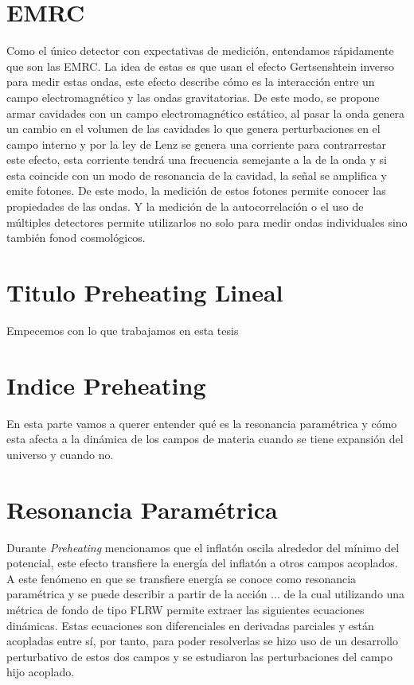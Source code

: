 \documentclass[letterpaper,12pt]{report}
\begin{document}
    \section{EMRC}
      Como el único detector con expectativas de medición, entendamos rápidamente que son las EMRC. La idea de estas es que usan el efecto Gertsenshtein inverso para medir estas ondas, este efecto describe cómo es la interacción entre un campo electromagnético y las ondas gravitatorias. De este modo, se propone armar cavidades con un campo electromagnético estático, al pasar la onda genera un cambio en el volumen de las cavidades lo que genera perturbaciones en el campo interno y por la ley de Lenz se genera una corriente para contrarrestar este efecto, esta corriente tendrá una frecuencia semejante a la de la onda y si esta coincide con un modo de resonancia de la cavidad, la señal se amplifica y emite fotones. De este modo, la medición de estos fotones permite conocer las propiedades de las ondas. Y la medición de la autocorrelación o el uso de múltiples detectores permite utilizarlos no solo para medir ondas individuales sino también fonod cosmológicos.

  \section{Titulo Preheating Lineal}
    Empecemos con lo que trabajamos en esta tesis
  
  \section{Indice Preheating}
    En esta parte vamos a querer entender qué es la resonancia paramétrica y cómo esta afecta a la dinámica de los campos de materia cuando se tiene expansión del universo y cuando no.

  \section{Resonancia Paramétrica}
    Durante \textit{Preheating} mencionamos que el inflatón oscila alrededor del mínimo del potencial, este efecto transfiere la energía del inflatón a otros campos acoplados. A este fenómeno en que se transfiere energía se conoce como resonancia paramétrica y se puede describir a partir de la acción ... de la cual utilizando una métrica de fondo de tipo FLRW  permite extraer las siguientes ecuaciones dinámicas. Estas ecuaciones son diferenciales en derivadas parciales y están acopladas entre sí, por tanto, para poder resolverlas se hizo uso de un desarrollo perturbativo de estos dos campos y se estudiaron las perturbaciones del campo hijo acoplado.
  
\end{document}

